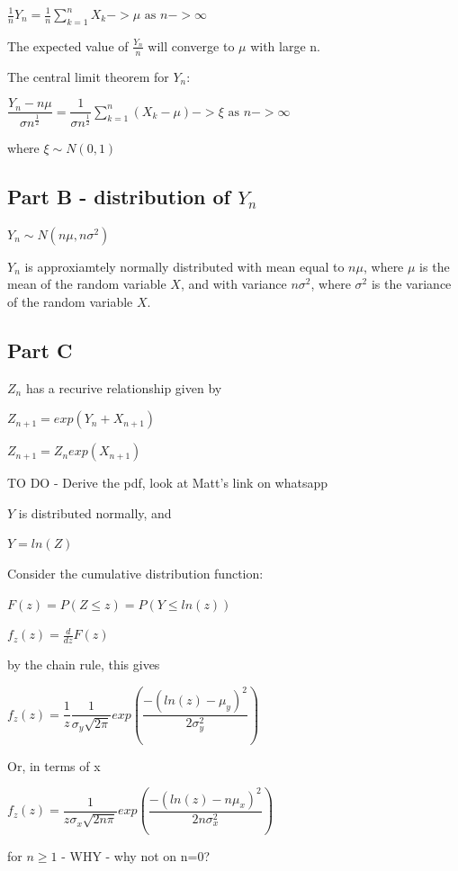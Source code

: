 \documentclass{article}
\begin{document}
$\frac{1}{n}Y_n = \frac{1}{n}\sum\limits_{k=1}^n X_k -> \mu \text{ as } n -> \infty$

The expected value of $\frac{Y_n}{n}$ will converge to $\mu$ with large n.

\bigskip
The central limit theorem for $Y_n$:

$\dfrac{Y_n - n\mu}{\sigma n^\frac{1}{2}} = \dfrac{1}{\sigma n^\frac{1}{2}}\sum\limits_{k=1}^n (X_k - \mu) -> \xi \text{ as } n -> \infty$

where $\xi \sim N(0,1)$

\subsection{Part B - distribution of $Y_n$}

$Y_n \sim N(n\mu, n\sigma^2)$

$Y_n$ is approxiamtely normally distributed with mean equal to $n\mu$, where $\mu$ is the mean of the random variable $X$, and with variance $n\sigma^2$, where $\sigma^2$ is the variance of the random variable $X$. 

\subsection{Part C}

$Z_n$ has a recurive relationship given by

$Z_{n+1} = exp(Y_n + X_{n+1})$

$Z_{n+1} = Z_n exp(X_{n+1})$

TO DO - Derive the pdf, look at Matt's link on whatsapp

$Y$ is distributed normally, and

$Y = ln(Z)$

\bigskip

Consider the cumulative distribution function:


$F(z) = P(Z \leq z) = P(Y \leq ln(z))$

$f_z(z) = \frac{d}{dz}F(z)$

by the chain rule, this gives

$f_z(z) = \dfrac{1}{z} \dfrac{1}{\sigma_y \sqrt{2\pi}}exp(\dfrac{-(ln(z)-\mu_y)^2}{2\sigma_y^2})$

Or, in terms of x

$f_z(z) = \dfrac{1}{z\sigma_x \sqrt{2n\pi}}exp(\dfrac{-(ln(z)-n\mu_x)^2}{2n\sigma_x^2})$

for $n \geq 1$ - WHY - why not on n=0?
\end{document}
